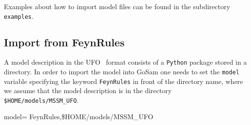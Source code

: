 \documentclass[11pt,a4paper]{refrep}
\newcommand{\gosam}{{\sc GoSam}\xspace}
\begin{document}
Examples about how to import model files can be found in the subdirectory 
 \texttt{examples}.

\subsection{Import from FeynRules}
A model description in the UFO~\cite{Degrande:2011ua} format consists of a \texttt{Python} package
stored in a directory. In order to import the model into \gosam{} one needs
to set the \texttt{model} variable specifying the keyword \texttt{FeynRules}
in front of the directory name, where we assume that
the model description is in the directory \texttt{\$HOME/models/MSSM\_UFO}.
\begin{example}
model= FeynRules,\$HOME/models/MSSM\_UFO
\end{example}
\end{document}
